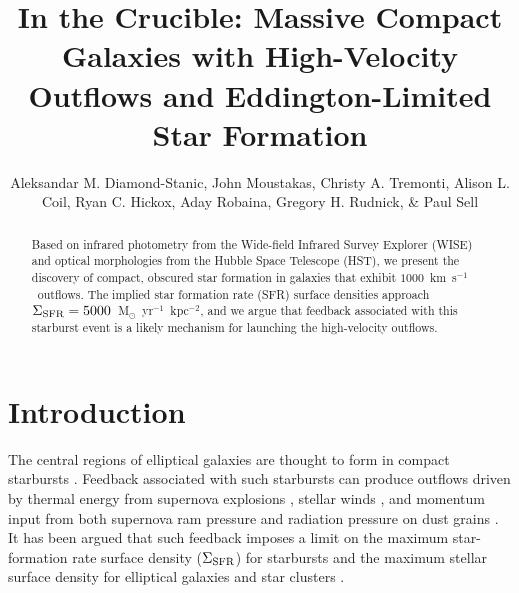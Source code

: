 \documentclass[apj]{emulateapj}
\newcommand{\kms}{km~s$^{-1}$}
\newcommand{\msun}{M$_{\odot}$}
\newcommand{\sigmasfr}{\Sigma_{\textnormal{\scriptsize{SFR}}}}
\begin{document}

\title{In the Crucible: Massive Compact Galaxies with High-Velocity
  Outflows and Eddington-Limited Star Formation}

\author{Aleksandar M. Diamond-Stanic, John
  Moustakas, Christy A. Tremonti,
  Alison L. Coil, Ryan C. Hickox, Aday
  Robaina, Gregory H. Rudnick, \& Paul
  Sell }




\begin{abstract}

Based on infrared photometry from the Wide-field Infrared Survey
Explorer (WISE) and optical morphologies from the Hubble Space
Telescope (HST), we present the discovery of compact, obscured star
formation in galaxies that exhibit $1000$~\kms\ outflows.  The implied
star formation rate (SFR) surface densities approach
$\sigmasfr=5000$~\msun~yr$^{-1}$~kpc$^{-2}$, and we argue that
feedback associated with this starburst event is a likely mechanism
for launching the high-velocity outflows.

\end{abstract}


\section{Introduction}

The central regions of elliptical galaxies are thought to form in
compact starbursts \citep[e.g.,][]{kor09,hop09}.  Feedback associated
with such starbursts can produce outflows driven by thermal energy
from supernova explosions \citep[e.g.,][]{che85}, stellar winds
\citep[e.g.,][]{lei92}, and momentum input from both supernova ram
pressure and radiation pressure on dust grains \citep[e.g.,][]{mur05}.
It has been argued that such feedback imposes a limit on the maximum
star-formation rate surface density ($\sigmasfr$) for starbursts
\citep[e.g.,][]{leh96,meu97,mur05,tho05} and the maximum stellar
surface density for elliptical galaxies and star clusters
\citep[e.g.,][]{hop10}.
\end{document}
